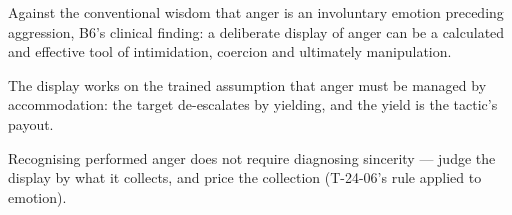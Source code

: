 

\begin{distilled}
  \item Against the conventional wisdom that anger is an involuntary emotion preceding aggression, B6's clinical finding: a deliberate display of anger can be a calculated and effective tool of intimidation, coercion and ultimately manipulation.
  \item The display works on the trained assumption that anger must be managed by accommodation: the target de-escalates by yielding, and the yield is the tactic's payout.
  \item Recognising performed anger does not require diagnosing sincerity --- judge the display by what it collects, and price the collection (T-24-06's rule applied to emotion).
\end{distilled}

